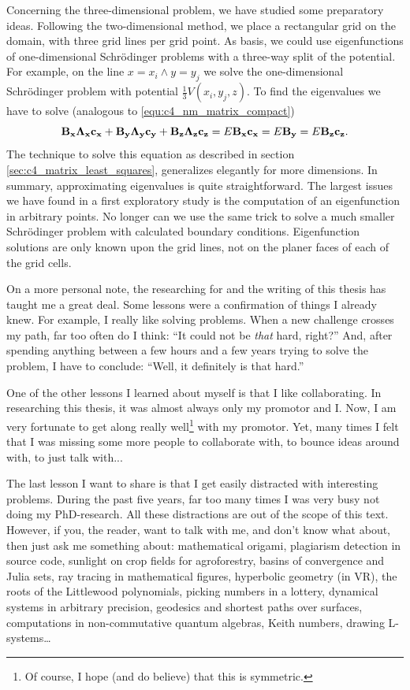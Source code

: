 Concerning the three-dimensional problem, we have studied some preparatory ideas. Following the two-dimensional method, we place a rectangular grid on the domain, with three grid lines per grid point. As basis, we could use eigenfunctions of one-dimensional Schrödinger problems with a three-way split of the potential. For example, on the line $x = x_i \land y = y_j$ we solve the one-dimensional Schrödinger problem with potential $\frac{1}{3} V(x_i, y_j, z)$. To find the eigenvalues we have to solve (analogous to \eqref{equ:c4_nm_matrix_compact})
$$
    \vb{B_x} \vb{\Lambda_x}\vb{c_x} + \vb{B_y} \vb{\Lambda_y}\vb{c_y} + \vb{B_z} \vb{\Lambda_z}\vb{c_z} = E \vb{B_x} \vb{c_x} = E \vb{B_y} = E \vb{B_z} \vb{c_z}\text{.}
$$
The technique to solve this equation as described in section \ref{sec:c4_matrix_least_squares}, generalizes elegantly for more dimensions. In summary, approximating eigenvalues is quite straightforward. The largest issues we have found in a first exploratory study is the computation of an eigenfunction in arbitrary points. No longer can we use the same trick to solve a much smaller Schrödinger problem with calculated boundary conditions. Eigenfunction solutions are only known upon the grid lines, not on the planer faces of each of the grid cells.

On a more personal note, the researching for and the writing of this thesis has taught me a great deal. Some lessons were a confirmation of things I already knew. For example, I really like solving problems. When a new challenge crosses my path, far too often do I think: ``It could not be \emph{that} hard, right?'' And, after spending anything between a few hours and a few years trying to solve the problem, I have to conclude: ``Well, it definitely is that hard.''

One of the other lessons I learned about myself is that I like collaborating. In researching this thesis, it was almost always only my promotor and I. Now, I am very fortunate to get along really well\footnote{Of course, I hope (and do believe) that this is symmetric.} with my promotor. Yet, many times I felt that I was missing some more people to collaborate with, to bounce ideas around with, to just talk with...

The last lesson I want to share is that I get easily distracted with interesting problems. During the past five years, far too many times I was very busy not doing my PhD-research. All these distractions are out of the scope of this text. However, if you, the reader, want to talk with me, and don't know what about, then just ask me something about:
mathematical origami,
plagiarism detection in source code,
sunlight on crop fields for agroforestry,
basins of convergence and Julia sets,
ray tracing in mathematical figures,
hyperbolic geometry (in VR),
the roots of the Littlewood polynomials,
picking numbers in a lottery,
dynamical systems in arbitrary precision,
geodesics and shortest paths over surfaces,
computations in non-commutative quantum algebras,
Keith numbers,
drawing L-systems\dots

